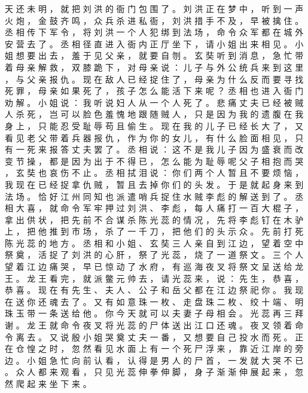 {天 还 未 明 ， 就 把 刘 洪 的 衙 门 包 围 了 。
刘 洪 正 在 梦 中 ， 听 到 一 声 火 炮 ， 金 鼓 齐 鸣 ， 众 兵 杀 进 私 衙 ， 刘 洪 措 手 不 及 ， 早 被 擒 住 。
丞 相 传 下 军 令 ， 将 刘 洪 一 个 人 犯 绑 到 法 场 ， 命 令 众 军 都 在 城 外 安 营 去 了 。
丞 相 径 直 进 入 衙 内 正 厅 坐 下 ， 请 小 姐 出 来 相 见 。
小 姐 想 要 出 去 ， 羞 于 见 父 亲 ， 就 要 自 刎 。
玄 奘 听 到 消 息 ， 急 忙 带 着 母 亲 解 救 ， 双 膝 跪 下 ， 对 母 亲 说 ： 儿 子 与 外 公 统 兵 来 到 这 里 ， 与 父 亲 报 仇 。
现 在 敌 人 已 经 捉 住 了 ， 母 亲 为 什 么 反 而 要 寻 找 死 罪 ， 母 亲 如 果 死 了 ， 孩 子 怎 么 能 活 下 来 呢 ？ 丞 相 也 进 入 衙 门 劝 解 。
小 姐 说 ： 我 听 说 妇 人 从 一 个 人 死 了 。
悲 痛 丈 夫 已 经 被 贼 人 杀 死 ， 岂 可 以 脸 色 羞 愧 地 跟 随 贼 人 ， 只 是 因 为 我 的 遗 腹 在 我 身 上 ， 只 能 忍 受 耻 辱 苟 且 偷 生 。
现 在 我 的 儿 子 已 经 长 大 了 ， 又 看 见 老 父 带 着 兵 器 报 仇 ， 作 为 你 的 女 儿 ， 有 什 么 脸 面 相 见 ， 只 有 一 死 来 报 答 丈 夫 罢 了 。
丞 相 说 ： 这 不 是 我 儿 子 因 为 盛 衰 而 改 变 节 操 ， 都 是 因 为 出 于 不 得 已 ， 怎 么 能 为 耻 辱 呢 父 子 相 抱 而 哭 ， 玄 奘 也 哀 伤 不 止 。
丞 相 拭 泪 说 ： 你 们 两 个 人 暂 且 不 要 烦 恼 ， 我 现 在 已 经 捉 拿 仇 贼 ， 暂 且 去 掉 你 们 的 头 发 。
于 是 就 起 身 来 到 法 场 。
恰 好 江 州 同 知 也 派 遣 哨 兵 捉 住 水 贼 李 彪 的 解 送 到 了 。
丞 相 大 喜 ， 就 命 令 军 牢 押 过 刘 洪 、 李 彪 ， 每 人 痛 打 一 百 大 棍 子 ， 拿 出 供 状 ， 把 先 前 不 合 谋 杀 陈 光 蕊 的 情 况 ， 先 将 李 彪 钉 在 木 驴 上 ， 把 他 推 到 市 场 ， 杀 了 一 千 刀 ， 把 他 们 的 头 示 众 。
先 前 打 死 陈 光 蕊 的 地 方 。
丞 相 和 小 姐 、 玄 奘 三 人 亲 自 到 江 边 ， 望 着 空 中 祭 奠 ， 活 捉 了 刘 洪 的 心 肝 ， 祭 了 光 蕊 ， 烧 了 一 道 祭 文 。
三 个 人 望 着 江 边 痛 哭 ， 早 已 惊 动 了 水 府 ， 有 巡 海 夜 叉 将 祭 文 呈 送 给 龙 王 。
龙 王 看 完 ， 就 派 鳖 元 帅 去 ， 请 光 蕊 来 ， 说 ： 先 生 ， 恭 喜 ， 恭 喜 。
现 在 有 先 生 、 夫 人 、 公 子 和 岳 父 都 在 江 边 祭 祀 你 。
我 现 在 送 你 还 魂 去 了 。
又 有 如 意 珠 一 枚 、 走 盘 珠 二 枚 、 绞 十 端 、 明 珠 玉 带 一 条 送 给 他 。
你 今 天 就 可 以 夫 妻 子 母 相 会 。
光 蕊 再 三 拜 谢 。
龙 王 就 命 令 夜 叉 将 光 蕊 的 尸 体 送 出 江 口 还 魂 。
夜 叉 领 着 命 令 离 去 。
又 说 殷 小 姐 哭 奠 丈 夫 一 番 ， 又 想 要 自 己 投 水 而 死 。
正 在 仓 惶 之 时 ， 忽 然 看 见 水 面 上 有 一 个 死 尸 浮 来 ， 靠 近 江 岸 的 旁 边 。
小 姐 急 忙 向 前 认 看 ， 认 得 是 男 人 的 尸 首 ， 一 发 就 大 哭 不 已 。
众 人 都 来 观 看 ， 只 见 光 蕊 伸 拳 伸 脚 ， 身 子 渐 渐 伸 展 起 来 ， 忽 然 爬 起 来 坐 下 来 。
}
